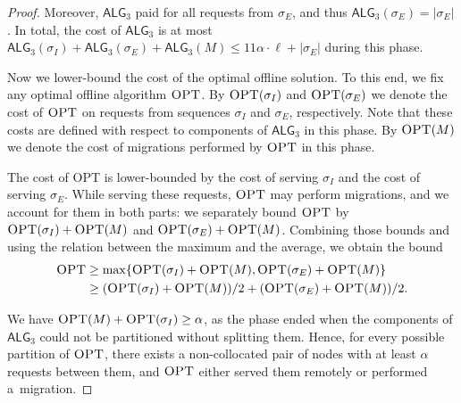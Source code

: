\documentclass[a4paper,anonymous,USenglish]{lipics-v2019}
\newcommand{\OPT}{\textsc{OPT}\xspace}
\newcommand{\TAlg}{{\ensuremath{\textsf{ALG}_{3}}}\xspace}
\newcommand\maciek[1]{\color{brown}\textbf{(Maciek: #1)}\color{black}}
\begin{document}
\begin{proof}
	
	Moreover, \TAlg paid for all requests from $\sigma_E$, and thus $\TAlg(\sigma_E) = |\sigma_E|$.
	In total, the cost of \TAlg is at most $\TAlg(\sigma_I) + \TAlg(\sigma_E) + \TAlg(M) \leq 11\alpha\cdot \ell + |\sigma_E|$ during this phase.
	
	\medskip
	
	Now we lower-bound the cost of the optimal offline solution.
	To this end, we fix any optimal offline algorithm $\OPT$.
	By $\OPT(\sigma_I)$ and $\OPT(\sigma_E)$ we denote the cost of $\OPT$ on requests from sequences $\sigma_I$ and $\sigma_E$, respectively.
	Note that these costs are defined with respect to components of \TAlg in this phase.
	By $\OPT(M)$ we denote the cost of migrations performed by $\OPT$ in this phase.
	
	The cost of \OPT is lower-bounded by the cost of serving $\sigma_I$ and the cost of serving $\sigma_E$.
	While serving these requests, $\OPT$ may perform migrations, and we account for them in both parts: we separately bound $\OPT$ by $\OPT(\sigma_I) + \OPT(M)$ and $\OPT(\sigma_E) + \OPT(M)$.
	Combining those bounds and using the relation between the maximum and the average, we obtain the bound
	\begin{align*}
		\OPT&\geq \max\{\OPT(\sigma_I) + \OPT(M), \OPT(\sigma_E) + \OPT(M)\}\\
		&\geq (\OPT(\sigma_I) + \OPT(M)) / 2 + (\OPT(\sigma_E) + \OPT(M)) / 2.
	\end{align*}
	
	
	We have $\OPT(M) + \OPT(\sigma_I) \geq \alpha$, as the phase ended when the components of \TAlg{} could not be partitioned without splitting them.
	Hence, for every possible partition of $\OPT$, there exists a non-collocated pair of nodes with at least $\alpha$ requests between them, and
	$\OPT$ either served them remotely or performed a~migration.
	

\end{proof}
\end{document}
